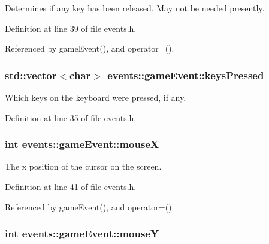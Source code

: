 Determines if any key has been released. May not be needed presently. 



Definition at line 39 of file events.\+h.



Referenced by game\+Event(), and operator=().

\hypertarget{structevents_1_1game_event_ac32c30a19cd0332094317a2f42e25b4b}{}
\subsubsection[{keys\+Pressed}]{\setlength{\rightskip}{0pt plus 5cm}std\+::vector$<$char$>$ events\+::game\+Event\+::keys\+Pressed}\label{structevents_1_1game_event_ac32c30a19cd0332094317a2f42e25b4b}


Which keys on the keyboard were pressed, if any. 



Definition at line 35 of file events.\+h.

\hypertarget{structevents_1_1game_event_a0d128e01aa0f7a2d1dec15b3753872e2}{}
\subsubsection[{mouse\+X}]{\setlength{\rightskip}{0pt plus 5cm}int events\+::game\+Event\+::mouse\+X}\label{structevents_1_1game_event_a0d128e01aa0f7a2d1dec15b3753872e2}


The x position of the cursor on the screen. 



Definition at line 41 of file events.\+h.



Referenced by game\+Event(), and operator=().

\hypertarget{structevents_1_1game_event_adbeaaa754e8cd4d5895ac37162d0bd6d}{}
\subsubsection[{mouse\+Y}]{\setlength{\rightskip}{0pt plus 5cm}int events\+::game\+Event\+::mouse\+Y}\label{structevents_1_1game_event_adbeaaa754e8cd4d5895ac37162d0bd6d}


